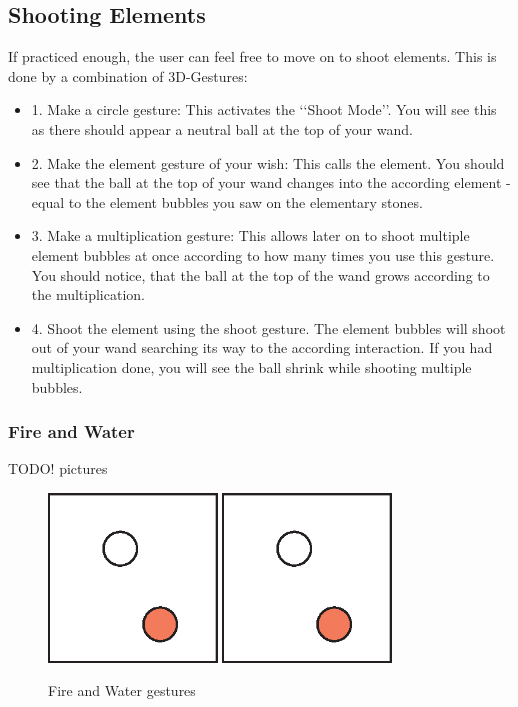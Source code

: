 \subsection{Shooting Elements}
If practiced enough, the user can feel free to move on to shoot elements. This is done by a combination of 3D-Gestures:
\begin{itemize}
\item{1.} Make a circle gesture: This activates the \lq\lq{}Shoot Mode\rq\rq{}. You will see this as there should appear a neutral ball at the top of your wand.
\item{2.} Make the element gesture of your wish: This calls the element. You should see that the ball at the top of your wand changes into the according element - equal to the element bubbles you saw on the elementary stones.
\item{3.} Make a multiplication gesture: This allows later on to shoot multiple element bubbles at once according to how many times you use this gesture. You should notice, that the ball at the top of the wand grows according to the multiplication.
\item{4.} Shoot the element using the shoot gesture. The element bubbles will shoot out of your wand searching its way to the according interaction. If you had multiplication done, you will see the ball shrink while shooting multiple bubbles.
\end{itemize}

\subsubsection{Fire and Water}
TODO! pictures\\
\begin{figure}[!ht]
\includegraphics[width=0.4\textwidth]{pictures/sample.eps}
\includegraphics[width=0.4\textwidth]{pictures/sample.eps}
\caption{Fire and Water gestures}
\end{figure}

